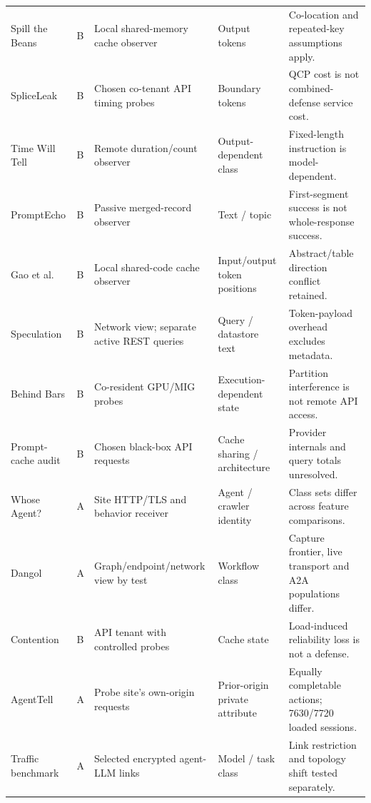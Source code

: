 \begin{table}[!t]
\begin{tabularx}{\textwidth}{@{}>{\raggedright\arraybackslash}p{}>{\raggedright\arraybackslash}p{}>{\raggedright\arraybackslash}p{}>{\raggedright\arraybackslash}p{}Y@{}}
Spill the Beans\newline \cite{spillbeans2025} & B & Local shared-memory cache observer & Output tokens & Co-location and repeated-key assumptions apply. \\
SpliceLeak \cite{spliceleak2026} & B & Chosen co-tenant API timing probes & Boundary tokens & QCP cost is not combined-defense service cost. \\
Time Will Tell\newline \cite{timewilltell2024} & B & Remote duration/count observer & Output-dependent class & Fixed-length instruction is model-dependent. \\
PromptEcho \cite{prompt_echo2026} & B & Passive merged-record observer & Text / topic & First-segment success is not whole-response success. \\
Gao et al. \cite{gao2025iknow} & B & Local shared-code cache observer & Input/output token positions & Abstract/table direction conflict retained. \\
Speculation \cite{wei2024speculation} & B & Network view; separate active REST queries & Query / datastore text & Token-payload overhead excludes metadata. \\
Behind Bars \cite{gu2026behindbars} & B & Co-resident GPU/MIG probes & Execution-dependent state & Partition interference is not remote API access. \\
Prompt-cache audit\newline \cite{gu2025promptcaching} & B & Chosen black-box API requests & Cache sharing / architecture & Provider internals and query totals unresolved. \\
Whose Agent? \cite{kang2026whoseagent} & A & Site HTTP/TLS and behavior receiver & Agent / crawler identity & Class sets differ across feature comparisons. \\
Dangol \cite{dangol2026workflow} & A & Graph/endpoint/network view by test & Workflow class & Capture frontier, live transport and A2A populations differ. \\
Contention \cite{abubakar2026contention} & B & API tenant with controlled probes & Cache state & Load-induced reliability loss is not a defense. \\
AgentTell \cite{shahriar2026agenttell} & A & Probe site's own-origin requests & Prior-origin private attribute & Equally completable actions; 7630/7720 loaded sessions. \\
Traffic benchmark\newline \cite{pouryousef2026traffic} & A & Selected encrypted agent-LLM links & Model / task class & Link restriction and topology shift tested separately. \\

\end{tabularx}
\end{table}
